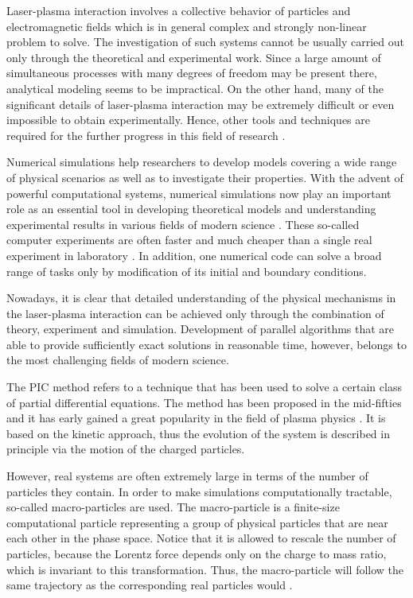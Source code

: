 Laser-plasma interaction involves a collective behavior of particles and electromagnetic fields which is in general complex and strongly non-linear problem to solve. The investigation of such systems cannot be usually carried out only through the theoretical and experimental work. Since a large amount of simultaneous processes with many degrees of freedom may be present there, analytical modeling seems to be impractical. On the other hand, many of the significant details of laser-plasma interaction may be extremely difficult or even impossible to obtain experimentally. Hence, other tools and techniques are required for the further progress in this field of research \cite{jaroszynsky}.

Numerical simulations help researchers to develop models covering a wide range of physical scenarios as well as to investigate their properties. With the advent of powerful computational systems, numerical simulations now play an important role as an essential tool in developing theoretical models and understanding experimental results in various fields of modern science \cite{pang}. These so-called computer experiments are often faster and much cheaper than a single real experiment in laboratory \cite{gould}. In addition, one numerical code can solve a broad range of tasks only by modification of its initial and boundary conditions.

Nowadays, it is clear that detailed understanding of the physical mechanisms in the laser-plasma interaction can be achieved only through the combination of theory, experiment and simulation. Development of parallel algorithms that are able to provide sufficiently exact solutions in reasonable time, however, belongs to the most challenging fields of modern science.

The PIC method refers to a technique that has been used to solve a certain class of partial differential equations. The method has been proposed in the mid-fifties and it has early gained a great popularity in the field of plasma physics \cite{birdsall, hockney, Verboncoeur2005}. It is based on the kinetic approach, thus the evolution of the system is described in principle via the motion of the charged particles.

However, real systems are often extremely large in terms of the number of particles they contain. In order to make simulations computationally tractable, so-called macro-particles are used. The macro-particle is a finite-size computational particle representing a group of physical particles that are near each other in the phase space. Notice that it is allowed to rescale the number of particles, because the Lorentz force depends only on the charge to mass ratio, which is invariant to this transformation. Thus, the macro-particle will follow the same trajectory as the corresponding real particles would \cite{hockney}.


